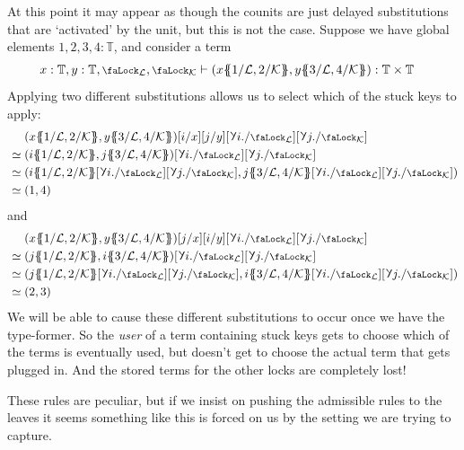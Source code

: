 \documentclass[10pt]{article}
\theoremstyle{definition}
\let\oldequiv\equiv%
\renewcommand{\equiv}{\simeq}
\newcommand{\defeq}{\oldequiv}
\newcommand{\yields}{\vdash}
\newcommand{\lock}{\mathchoice {\scalebox{0.8}{\text{\faLock}}}
  {\scalebox{0.8}{\text{\faLock}}} {\scalebox{0.5}{\text{\faLock}}}
  {\scalebox{0.4}{\text{\faLock}}} }
\newcommand{\rbindsym}{%
  \mathchoice
    {\reflectbox{\rotatebox[origin=c]{185}{$\lambda$}}}  %
    {\reflectbox{\rotatebox[origin=c]{185}{$\lambda$}}}  %
    {\reflectbox{\rotatebox[origin=c]{185}{$\scriptstyle\lambda$}}}  %
    {\reflectbox{\rotatebox[origin=c]{185}{$\scriptscriptstyle\lambda$}}}  %
  }
\newcommand{\rbind}[1]{\rbindsym{} #1.}
\newcommand{\Tiny}{\mathbb{T}}
\newcommand{\lockn}[1]{\mathcal{#1}}
\newcommand{\ctxlocke}[1]{\lock_{#1}}
\newcommand{\ctxlock}[1]{\ctxlocke{\lockn{#1}}}
\newcommand{\stubra}[1]{\{\!\!\{ #1 \}\!\!\}}
\newcommand{\subkeysep}[2]{#1/#2}
\newcommand{\subkeyo}[2]{\subkeysep{#1}{\lockn{#2}}}
\begin{document}
At this point it may appear as though the counits are just delayed
substitutions that are `activated' by the unit, but this is not the
case. Suppose we have global elements $1, 2, 3, 4 : \Tiny$, and
consider a term
\begin{align*}
  x : \Tiny, y : \Tiny, \ctxlock{L}, \ctxlock{K}
  &\yields
    (x\stubra{\subkeyo{1}{L},\subkeyo{2}{K}},y\stubra{\subkeyo{3}{L},\subkeyo{4}{K}})
    : \Tiny \times \Tiny
\end{align*}
Applying two different substitutions allows us to select which of the
stuck keys to apply:
\begin{align*}
  &\phantom{{}\defeq{}} (x\stubra{\subkeyo{1}{L},\subkeyo{2}{K}}, y\stubra{\subkeyo{3}{L},\subkeyo{4}{K}})[i/x][j/y][\rbind{i}/\ctxlock{L}][\rbind{j}/\ctxlock{K}] \\
  &\defeq (i\stubra{\subkeyo{1}{L},\subkeyo{2}{K}}, j\stubra{\subkeyo{3}{L},\subkeyo{4}{K}})[\rbind{i}/\ctxlock{L}][\rbind{j}/\ctxlock{K}] \\
  &\defeq (i\stubra{\subkeyo{1}{L},\subkeyo{2}{K}}[\rbind{i}/\ctxlock{L}][\rbind{j}/\ctxlock{K}], j\stubra{\subkeyo{3}{L},\subkeyo{4}{K}}[\rbind{i}/\ctxlock{L}][\rbind{j}/\ctxlock{K}]) \\
  &\defeq (1, 4)
\end{align*}
and
\begin{align*}
  &\phantom{{}\defeq{}} (x\stubra{\subkeyo{1}{L},\subkeyo{2}{K}}, y\stubra{\subkeyo{3}{L},\subkeyo{4}{K}})[j/x][i/y][\rbind{i}/\ctxlock{L}][\rbind{j}/\ctxlock{K}] \\
  &\defeq (j\stubra{\subkeyo{1}{L},\subkeyo{2}{K}}, i\stubra{\subkeyo{3}{L},\subkeyo{4}{K}})[\rbind{i}/\ctxlock{L}][\rbind{j}/\ctxlock{K}] \\
  &\defeq (j\stubra{\subkeyo{1}{L},\subkeyo{2}{K}}[\rbind{i}/\ctxlock{L}][\rbind{j}/\ctxlock{K}], i\stubra{\subkeyo{3}{L},\subkeyo{4}{K}}[\rbind{i}/\ctxlock{L}][\rbind{j}/\ctxlock{K}]) \\
  &\defeq (2, 3)
\end{align*}
We will be able to cause these different substitutions to occur once
we have the type-former. So the \emph{user} of a term containing stuck
keys gets to choose which of the terms is eventually used, but doesn't
get to choose the actual term that gets plugged in. And the stored
terms for the other locks are completely lost!

These rules are peculiar, but if we insist on pushing the admissible
rules to the leaves it seems something like this is forced on us by
the setting we are trying to capture.
\end{document}
